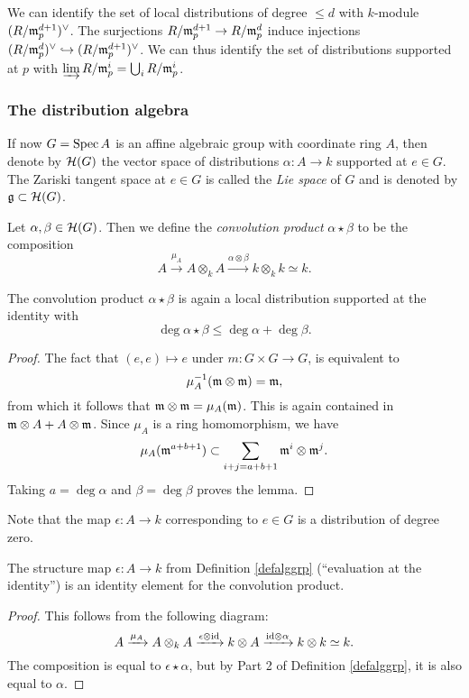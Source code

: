 \documentclass[11pt, english]{article}
\begin{document}
We can identify the set of local distributions of degree $\leq d$ with $k$-module $(R/\mathfrak{m}_p^{d+1})^\vee$. The surjections $R/\mathfrak{m}_p^{d+1} \to R/\mathfrak{m}_p^{d}$ induce injections $(R/\mathfrak{m}_p^d)^\vee \hookrightarrow (R/\mathfrak{m}_p^{d+1})^\vee$. We can thus identify the set of distributions supported at $p$ with $\varinjlim R/\mathfrak{m}_p^i = \bigcup_i R/\mathfrak{m}_p^i$.

\subsubsection{The distribution algebra}

If now $G=\operatorname{Spec} A$ is an affine algebraic group with coordinate ring $A$, then denote by $\mathcal{H}(G)$ the vector space of distributions $\alpha:A \to k$ supported at $e \in G$. The Zariski tangent space at $e \in G$ is called the \emph{Lie space} of $G$ and is denoted by $\mathfrak g \subset \mathcal{H}(G)$.

\begin{defi}
 Let $\alpha,\beta \in \mathcal{H}(G)$. Then we define the \emph{convolution product} $\alpha \star \beta$ to be the composition
$$
A \xrightarrow{\mu_A} A \otimes_k A \xrightarrow{\alpha \otimes \beta} k \otimes_k k \simeq k.
$$
\end{defi}

\begin{lemma}
The convolution product $\alpha \star \beta$ is again a local distribution supported at the identity with
$$
\deg \alpha \star \beta \leq \deg \alpha + \deg \beta.
$$
\end{lemma}
\begin{proof}
The fact that $(e,e) \mapsto e$ under $m:G \times G \to G$, is equivalent to
$$
\mu_A^{-1}(\mathfrak{m} \otimes \mathfrak{m})=\mathfrak{m},
$$
from which it follows that $\mathfrak{m} \otimes \mathfrak{m} = \mu_A(\mathfrak{m})$. This is again contained in $\mathfrak{m} \otimes A + A \otimes \mathfrak{m}$. Since $\mu_A$ is a ring homomorphism, we have
$$
\mu_A(\mathfrak{m}^{a+b+1}) \subset \sum_{i+j=a+b+1} \mathfrak{m}^i \otimes \mathfrak{m}^j.
$$
Taking $a = \deg \alpha$ and $\beta = \deg \beta$ proves the lemma.
\end{proof}

Note that the map $\epsilon:A \to k$ corresponding to $e \in G$ is a distribution of degree zero.

\begin{lemma}
The structure map $\epsilon:A \to k$ from Definition \ref{defalggrp} (``evaluation at the identity'') is an identity element for the convolution product.
\end{lemma}
\begin{proof}
This follows from the following diagram:
\[
A \xrightarrow{\mu_A} A \otimes_k A \xrightarrow{\epsilon \otimes \text{id}} k \otimes A \xrightarrow{\text{id} \otimes \alpha} k \otimes k \simeq k.
\]
The composition is equal to $\epsilon \star \alpha$, but by Part 2 of Definition \ref{defalggrp}, it is also equal to $\alpha$.
\end{proof}
\end{document}
